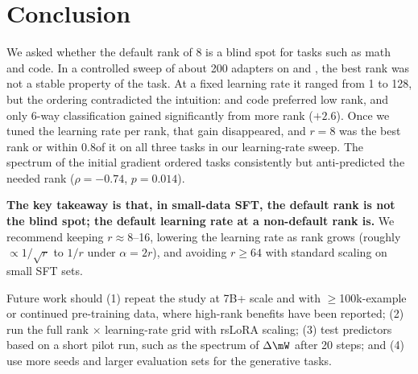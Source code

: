 \section{Conclusion}
\label{sec:conclusion}

We asked whether the default \lora rank of 8 is a blind spot for tasks such as math and code. In a controlled sweep of about 200 adapters on \qsmall and \qlarge, the best rank was not a stable property of the task. At a fixed learning rate it ranged from 1 to 128, but the ordering contradicted the intuition: \gsm and code preferred low rank, and only 6-way \emotion classification gained significantly from more rank ($+2.6$\pp). Once we tuned the learning rate per rank, that gain disappeared, and $r{=}8$ was the best rank or within 0.8\pp of it on all three tasks in our learning-rate sweep. The spectrum of the initial gradient ordered tasks consistently but anti-predicted the needed rank ($\rho=-0.74$, $p=0.014$).

{\bf The key takeaway is that, in small-data SFT, the default rank is not the blind spot; the default learning rate at a non-default rank is.} We recommend keeping $r\approx 8$--16, lowering the learning rate as rank grows (roughly $\propto 1/\sqrt{r}$ to $1/r$ under $\alpha=2r$), and avoiding $r\geq 64$ with standard scaling on small SFT sets.

Future work should (1) repeat the study at 7B+ scale and with $\geq$100k-example or continued pre-training data, where high-rank benefits have been reported; (2) run the full rank $\times$ learning-rate grid with rsLoRA scaling; (3) test predictors based on a short pilot run, such as the spectrum of $\Delta\mW$ after 20 steps; and (4) use more seeds and larger evaluation sets for the generative tasks.
